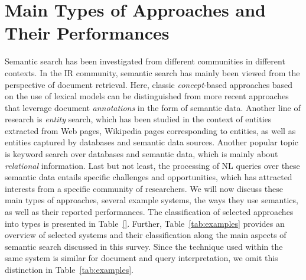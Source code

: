 \section{Main Types of Approaches and Their Performances}\label{sec:approaches}	
Semantic search has been investigated from different communities in different contexts. In the IR community, semantic search has mainly been viewed from the perspective of document retrieval. Here, classic \emph{concept}-based approaches based on the use of lexical models can be distinguished from more recent approaches that leverage document \emph{annotations} in the form of semantic data. Another line of research is \emph{entity} search, which has been studied in the context of entities extracted from Web pages, Wikipedia pages corresponding to entities, as well as entities captured by databases and semantic data sources. Another popular topic is keyword search over databases and semantic data, which is mainly about \emph{relational} information. Last but not least, the processing of NL queries over these semantic data entails specific challenges and opportunities, which has attracted interests from a specific community of researchers. We will now discuss these main types of approaches, several example systems, the ways they use semantics, as well as their reported performances. The classification of selected approaches into types is presented in Table~\ref{}. Further, Table~\ref{tab:examples} provides an overview of selected systems and their classification along the main aspects of semantic search discussed in this survey. Since the technique used within the same system is similar for document and query interpretation, we omit this distinction in Table~\ref{tab:examples}. 



